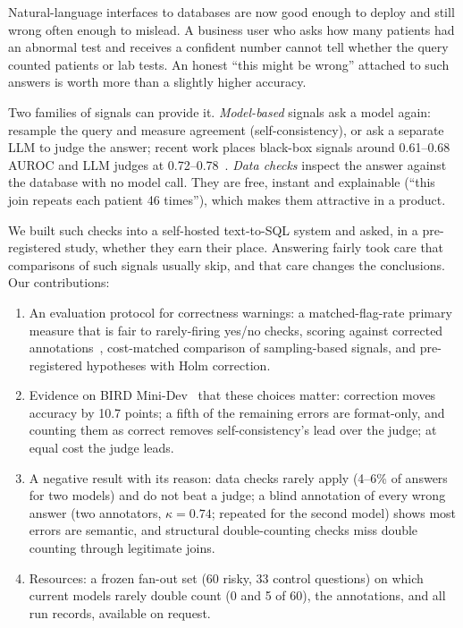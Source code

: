 \documentclass[conference]{IEEEtran}
\begin{document}
Natural-language interfaces to databases are now good enough to deploy and still wrong often enough
to mislead. A business user who asks how many patients had an abnormal test and receives a confident
number cannot tell whether the query counted patients or lab tests. An honest ``this might be wrong''
attached to such answers is worth more than a slightly higher accuracy.

Two families of signals can provide it. \emph{Model-based} signals ask a model again: resample the
query and measure agreement (self-consistency), or ask a separate LLM to judge the answer; recent work
places black-box signals around 0.61--0.68 AUROC and LLM judges at 0.72--0.78~\cite{richardson2026predicts}. \emph{Data checks} inspect the answer against the database with no
model call. They are free, instant and explainable (``this join repeats each patient 46 times''),
which makes them attractive in a product.

We built such checks into a self-hosted text-to-SQL system and asked, in a pre-registered study,
whether they earn their place. Answering fairly took care that comparisons of such signals usually
skip, and that care changes the conclusions. Our contributions:
\begin{enumerate}
\item An evaluation protocol for correctness warnings: a matched-flag-rate primary measure that is fair
to rarely-firing yes/no checks, scoring against corrected annotations~\cite{jin2026annotation},
cost-matched comparison of sampling-based signals, and pre-registered hypotheses with Holm correction.
\item Evidence on BIRD Mini-Dev~\cite{li2023bird} that these choices matter: correction moves accuracy
by 10.7 points; a fifth of the remaining errors are format-only, and counting them as correct removes
self-consistency's lead over the judge; at equal cost the judge leads.
\item A negative result with its reason: data checks rarely apply (4--6\% of answers for two models) and
do not beat a judge; a blind annotation of every wrong answer (two annotators, $\kappa=0.74$; repeated
for the second model) shows most errors are semantic, and structural double-counting checks miss
double counting through legitimate joins.
\item Resources: a frozen fan-out set (60 risky, 33 control questions) on which current models
rarely double count (0 and 5 of 60), the annotations, and all run records, available on request.
\end{enumerate}
\end{document}
